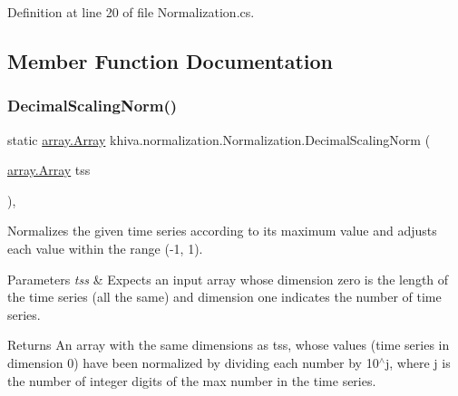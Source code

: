 Definition at line 20 of file Normalization.\+cs.



\subsection{Member Function Documentation}
\mbox{\label{classkhiva_1_1normalization_1_1_normalization_a291b871a81c368b7d3319858edcf1de0}} 
\subsubsection{\texorpdfstring{Decimal\+Scaling\+Norm()}{DecimalScalingNorm()}\hspace{0.1cm}{\footnotesize\ttfamily [1/2]}}
{\footnotesize\ttfamily static \mbox{\hyperlink{classkhiva_1_1array_1_1_array}{array.\+Array}} khiva.\+normalization.\+Normalization.\+Decimal\+Scaling\+Norm (\begin{DoxyParamCaption}\item[{\mbox{\hyperlink{classkhiva_1_1array_1_1_array}{array.\+Array}}}]{tss }\end{DoxyParamCaption})\hspace{0.3cm}{\ttfamily [inline]}, {\ttfamily [static]}}



Normalizes the given time series according to its maximum value and adjusts each value within the range (-\/1, 1). 


\begin{DoxyParams}{Parameters}
{\em tss} & Expects an input array whose dimension zero is the length of the time series (all the same) and dimension one indicates the number of time series.\\
\hline
\end{DoxyParams}
\begin{DoxyReturn}{Returns}
An array with the same dimensions as tss, whose values (time series in dimension 0) have been normalized by dividing each number by 10$^\wedge$j, where j is the number of integer digits of the max number in the time series.
\end{DoxyReturn}


